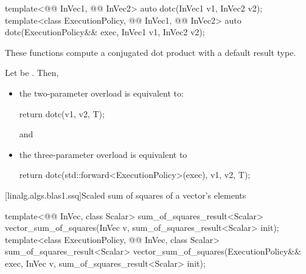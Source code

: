 %
\begin{itemdecl}
template<@@ InVec1, @@ InVec2>
  auto dotc(InVec1 v1, InVec2 v2);
template<class ExecutionPolicy, @@ InVec1, @@ InVec2>
  auto dotc(ExecutionPolicy&& exec,
            InVec1 v1, InVec2 v2);
\end{itemdecl}

\begin{itemdescr}

\pnum
These functions compute a conjugated dot product with a default result type.

\pnum
\effects
Let  be .
Then,
\begin{itemize}
\item
the two-parameter overload is equivalent to:
\begin{codeblock}
return dotc(v1, v2, T{});
\end{codeblock}
and
\item
the three-parameter overload is equivalent to
\begin{codeblock}
return dotc(std::forward<ExecutionPolicy>(exec), v1, v2, T{});
\end{codeblock}
\end{itemize}
\end{itemdescr}

[linalg.algs.blas1.ssq]{Scaled sum of squares of a vector's elements}

%
\begin{itemdecl}
template<@@ InVec, class Scalar>
  sum_of_squares_result<Scalar> vector_sum_of_squares(InVec v, sum_of_squares_result<Scalar> init);
template<class ExecutionPolicy, @@ InVec, class Scalar>
  sum_of_squares_result<Scalar> vector_sum_of_squares(ExecutionPolicy&& exec,
                                                      InVec v, sum_of_squares_result<Scalar> init);
\end{itemdecl}

